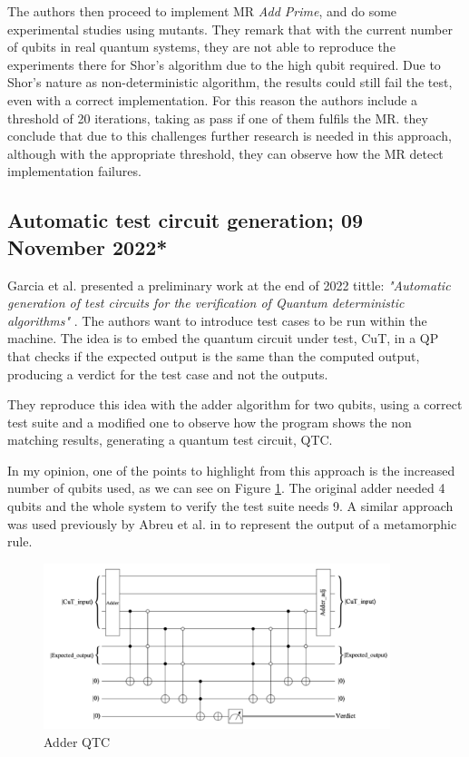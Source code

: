\begin{itemize}
The authors then proceed to implement MR \textit{Add Prime}, and do some experimental studies using mutants. They remark that with the current number of qubits in real quantum systems, they are not able to reproduce the experiments there for Shor's algorithm due to the high qubit required. Due to Shor's nature as non-deterministic algorithm, the results could still fail the test, even with a correct implementation. For this reason the authors include a threshold of 20 iterations, taking as pass if one of them fulfils the MR. they conclude that due to this challenges further research is needed in this approach, although with the appropriate threshold, they can observe how the MR detect implementation failures. 

\vspace{15pt}
\subsection{Automatic test circuit generation; 09 November 2022*}

Garcia et al. presented a preliminary work at the end of 2022 tittle: \textit{"Automatic generation of test circuits for the verification of Quantum deterministic algorithms"} \cite{garcia2022automatic}. The authors want to introduce test cases to be run within the machine. The idea is to embed the quantum circuit under test, CuT, in a QP that checks if the expected output is the same than the computed output, producing a verdict for the test case and not the outputs.\newline

They reproduce this idea with the adder algorithm for two qubits, using a correct test suite and a modified one to observe how the program shows the non matching results, generating a quantum test circuit, QTC.\newline

In my opinion, one of the points to highlight from this approach is the increased number of qubits used, as we can see on Figure \ref{Fig:GarciaAdder}. The original adder needed 4 qubits and the whole system to verify the test suite needs 9. A similar approach was used previously by Abreu et al. in \cite{abreu2022metamorphic} to represent the output of a metamorphic rule.

\begin{figure}[H]
        \centering
        \includegraphics[width=0.9\textwidth]{TFM/photos/GarciaAdder.png}
        \caption{Adder QTC \cite{garcia2022automatic}} 
        \label{Fig:GarciaAdder}
\end{figure}


\end{itemize}
